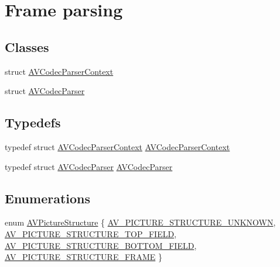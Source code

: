 \hypertarget{group__lavc__parsing}{}\section{Frame parsing}
\label{group__lavc__parsing}
\subsection*{Classes}
\begin{DoxyCompactItemize}
\item 
struct \hyperlink{struct_a_v_codec_parser_context}{A\+V\+Codec\+Parser\+Context}
\item 
struct \hyperlink{struct_a_v_codec_parser}{A\+V\+Codec\+Parser}
\end{DoxyCompactItemize}
\subsection*{Typedefs}
\begin{DoxyCompactItemize}
\item 
typedef struct \hyperlink{struct_a_v_codec_parser_context}{A\+V\+Codec\+Parser\+Context} \hyperlink{group__lavc__parsing_gab6849a20c5d551be1f9e5edb5b744e7b}{A\+V\+Codec\+Parser\+Context}
\item 
typedef struct \hyperlink{struct_a_v_codec_parser}{A\+V\+Codec\+Parser} \hyperlink{group__lavc__parsing_gadb3b262c2ee8f5fca90709796973c38e}{A\+V\+Codec\+Parser}
\end{DoxyCompactItemize}
\subsection*{Enumerations}
\begin{DoxyCompactItemize}
\item 
enum \hyperlink{group__lavc__parsing_gaad2e1cb6faa858b3558c5182d3ec56aa}{A\+V\+Picture\+Structure} \{ \hyperlink{group__lavc__parsing_ggaad2e1cb6faa858b3558c5182d3ec56aaa88e5d6e12b558d4d015fa2b3b043cb91}{A\+V\+\_\+\+P\+I\+C\+T\+U\+R\+E\+\_\+\+S\+T\+R\+U\+C\+T\+U\+R\+E\+\_\+\+U\+N\+K\+N\+O\+WN}, 
\hyperlink{group__lavc__parsing_ggaad2e1cb6faa858b3558c5182d3ec56aaa86a376b542e532a5f2be40b56a79f161}{A\+V\+\_\+\+P\+I\+C\+T\+U\+R\+E\+\_\+\+S\+T\+R\+U\+C\+T\+U\+R\+E\+\_\+\+T\+O\+P\+\_\+\+F\+I\+E\+LD}, 
\hyperlink{group__lavc__parsing_ggaad2e1cb6faa858b3558c5182d3ec56aaa6d82ada133fd9cff3e9577a2134dba5b}{A\+V\+\_\+\+P\+I\+C\+T\+U\+R\+E\+\_\+\+S\+T\+R\+U\+C\+T\+U\+R\+E\+\_\+\+B\+O\+T\+T\+O\+M\+\_\+\+F\+I\+E\+LD}, 
\hyperlink{group__lavc__parsing_ggaad2e1cb6faa858b3558c5182d3ec56aaa1b90bcaf885c0721b70702a14fec481c}{A\+V\+\_\+\+P\+I\+C\+T\+U\+R\+E\+\_\+\+S\+T\+R\+U\+C\+T\+U\+R\+E\+\_\+\+F\+R\+A\+ME}
 \}
\end{DoxyCompactItemize}
